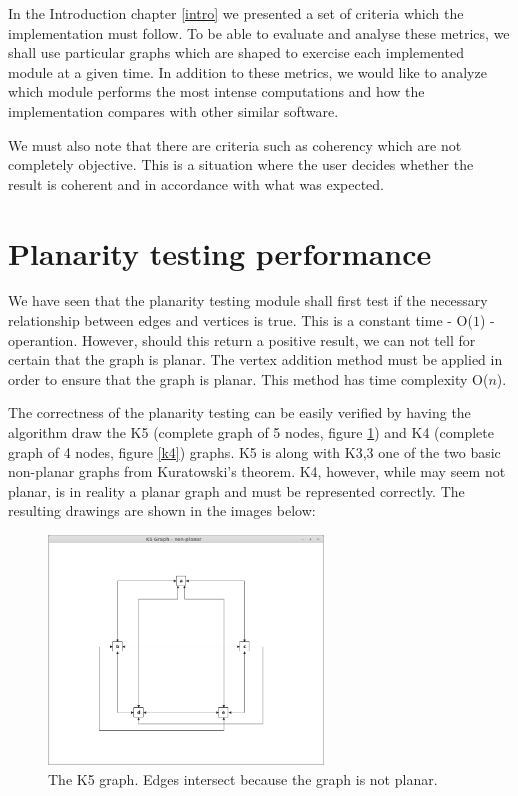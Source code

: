 In the Introduction chapter \ref{intro} we presented a set of criteria which the implementation must follow.
To be able to evaluate and analyse these metrics, we shall use particular graphs which are shaped to exercise 
each implemented module at a given time. In addition to these metrics, we would like to analyze 
which module performs the most intense computations and how the implementation compares with other 
similar software.

We must also note that there are criteria such as coherency which are not completely objective. This is a 
situation where the user decides whether the result is coherent and in accordance with what was expected.

\section{Planarity testing performance}

We have seen that the planarity testing module shall first test if the necessary relationship between 
edges and vertices is true. This is a constant time - O(${1}$) - operantion. However, should this 
return a positive result, we can not tell for certain that the graph is planar. The vertex addition method 
must be applied in order to ensure that the graph is planar. This method has time complexity O(${n}$).

The correctness of the planarity testing can be easily verified by having the algorithm draw the K5 (complete 
graph of 5 nodes, figure \ref{k5}) and K4 (complete graph of 4 nodes, figure \ref {k4}) graphs. K5 is along with K3,3 one of the two basic 
non-planar graphs from Kuratowski's theorem. K4, however, while may seem not planar, is in reality a planar 
graph and must be represented correctly. The resulting drawings are shown in the images below:

\begin{figure}[ht] \centering
\includegraphics[width=0.65\textwidth]{img/results/k5graph.png}
\caption{The K5 graph. Edges intersect because the graph is not planar. \label{k5}} \end{figure}

